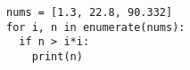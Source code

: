 \documentclass{article}
\begin{document}
\fontsize{30}{30}\selectfont

\lstset{language=Python}   
\begin{lstlisting}
nums = [1.3, 22.8, 90.332]
for i, n in enumerate(nums):
  if n > i*i:
    print(n)
\end{lstlisting}
\end{document}
